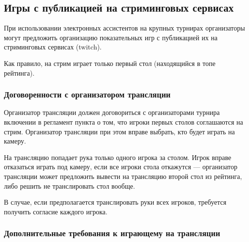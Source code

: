\subsection{Игры с публикацией на стриминговых сервисах}

При использовании электронных ассистентов на крупных турнирах организаторы могут предложить организацию показательных игр с публикацией их на стриминговых сервисах (twitch).

Как правило, на стрим играет только первый стол (находящийся в топе рейтинга).

\subsubsection{Договоренности с организатором трансляции}

Организатор трансляции должен договориться с организаторами турнира включении в регламент пункта о том, что игроки первых столов соглашаются на стрим. Организатор трансляции при этом вправе выбрать, кто будет играть на камеру.

На трансляцию попадает рука только одного игрока за столом. Игрок вправе отказаться играть под камеру, если все игроки стола откажутся --- организатор трансляции может предложить вывести на трансляцию второй стол из рейтинга, либо решить не транслировать стол вообще.

В случае, если предполагается транслировать руки всех игроков, требуется получить согласие каждого игрока.

\subsubsection{Дополнительные требования к играющему на трансляции}

